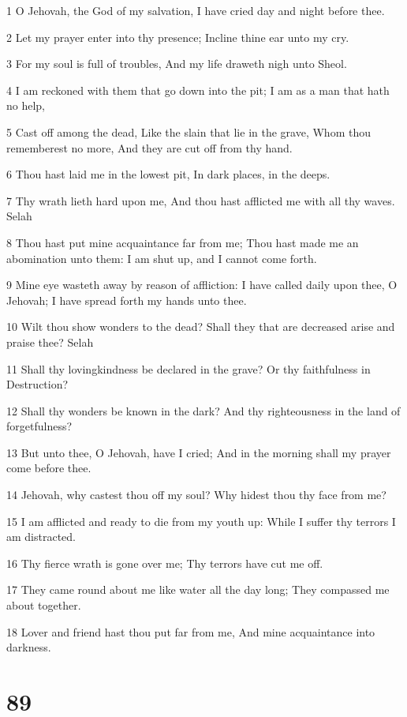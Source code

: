 \par 1 O Jehovah, the God of my salvation, I have cried day and night before thee.
\par 2 Let my prayer enter into thy presence; Incline thine ear unto my cry.
\par 3 For my soul is full of troubles, And my life draweth nigh unto Sheol.
\par 4 I am reckoned with them that go down into the pit; I am as a man that hath no help,
\par 5 Cast off among the dead, Like the slain that lie in the grave, Whom thou rememberest no more, And they are cut off from thy hand.
\par 6 Thou hast laid me in the lowest pit, In dark places, in the deeps.
\par 7 Thy wrath lieth hard upon me, And thou hast afflicted me with all thy waves. Selah
\par 8 Thou hast put mine acquaintance far from me; Thou hast made me an abomination unto them: I am shut up, and I cannot come forth.
\par 9 Mine eye wasteth away by reason of affliction: I have called daily upon thee, O Jehovah; I have spread forth my hands unto thee.
\par 10 Wilt thou show wonders to the dead? Shall they that are decreased arise and praise thee? Selah
\par 11 Shall thy lovingkindness be declared in the grave? Or thy faithfulness in Destruction?
\par 12 Shall thy wonders be known in the dark? And thy righteousness in the land of forgetfulness?
\par 13 But unto thee, O Jehovah, have I cried; And in the morning shall my prayer come before thee.
\par 14 Jehovah, why castest thou off my soul? Why hidest thou thy face from me?
\par 15 I am afflicted and ready to die from my youth up: While I suffer thy terrors I am distracted.
\par 16 Thy fierce wrath is gone over me; Thy terrors have cut me off.
\par 17 They came round about me like water all the day long; They compassed me about together.
\par 18 Lover and friend hast thou put far from me, And mine acquaintance into darkness.

\chapter{89}

